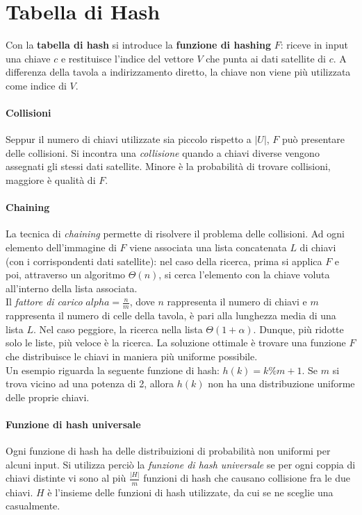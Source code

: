 \section{Tabella di Hash}
Con la \textbf{tabella di hash} si introduce la \textbf{funzione di hashing} $F$: riceve in input una chiave $c$ e restituisce l'indice del vettore $V$ che punta ai dati satellite di $c$. A differenza della tavola a indirizzamento diretto, la chiave non viene più utilizzata come indice di $V$.

\paragraph{Collisioni}
Seppur il numero di chiavi utilizzate sia piccolo rispetto a $|U|$, $F$ può presentare delle collisioni. Si incontra una \textit{collisione} quando a chiavi diverse vengono assegnati gli stessi dati satellite. Minore è la probabilità di trovare collisioni, maggiore è qualità di $F$.

\paragraph{Chaining}
La tecnica di \textit{chaining} permette di risolvere il problema delle collisioni. Ad ogni elemento dell'immagine di $F$ viene associata una lista concatenata $L$ di chiavi (con i corrispondenti dati satellite): nel caso della ricerca, prima si applica $F$ e poi, attraverso un algoritmo $\varTheta(n)$, si cerca l'elemento con la chiave voluta all'interno della lista associata.\\
Il \textit{fattore di carico} $alpha = \frac{n}{m}$, dove $n$ rappresenta il numero di chiavi e $m$ rappresenta il numero di celle della tavola, è pari alla lunghezza media di una lista $L$. Nel caso peggiore, la ricerca nella lista $\varTheta(1+\alpha)$. Dunque, più ridotte solo le liste, più veloce è la ricerca. La soluzione ottimale è trovare una funzione $F$ che distribuisce le chiavi in maniera più uniforme possibile.\\
Un esempio riguarda la seguente funzione di hash: $h(k) = k \% m + 1$. Se $m$ si trova vicino ad una potenza di 2, allora $h(k)$ non ha una distribuzione uniforme delle proprie chiavi.

\paragraph{Funzione di hash universale}
Ogni funzione di hash ha delle distribuizioni di probabilità non uniformi per alcuni input. Si utilizza perciò la \textit{funzione di hash universale} se per ogni coppia di chiavi distinte vi sono al più $\frac{|H|}{m}$ funzioni di hash che causano collisione fra le due chiavi. $H$ è l'insieme delle funzioni di hash utilizzate, da cui se ne sceglie una casualmente.
